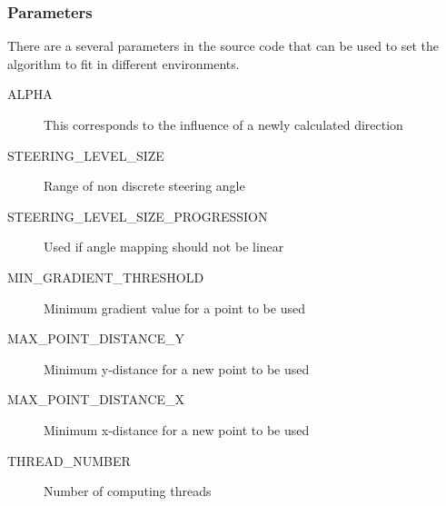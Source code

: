 \subsubsection{Parameters}
There are a several parameters in the source code that can be used to set the algorithm to fit in different environments.
\begin{description}
	\item [\small ALPHA] This corresponds to the influence of a newly calculated direction
	\item [\small STEERING\_LEVEL\_SIZE] Range of non discrete steering angle
	\item [\small STEERING\_LEVEL\_SIZE\_PROGRESSION] Used if angle mapping should not be linear
	\item [\small MIN\_GRADIENT\_THRESHOLD] Minimum gradient value for a point to be used
	\item [\small MAX\_POINT\_DISTANCE\_Y] Minimum y-distance for a new point to be used
	\item [\small MAX\_POINT\_DISTANCE\_X] Minimum x-distance for a new point to be used
	\item [\small THREAD\_NUMBER] Number of computing threads
\end{description}